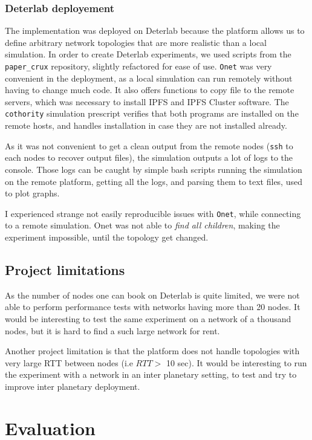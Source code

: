 \documentclass[a4paper,11pt,oneside]{report}
\begin{document}
\subsection{Deterlab deployement}

The implementation was deployed on Deterlab \cite{deterlab} because the platform allows us to define arbitrary network topologies that are more realistic than a local simulation. In order to create Deterlab experiments, we used scripts from the \texttt{paper\_crux} \cite{paper_crux} repository, slightly refactored for ease of use. \texttt{Onet} was very convenient in the deployment, as a local simulation can run remotely without having to change much code. It also offers functions to copy file to the remote servers, which was necessary to install IPFS and IPFS Cluster software. The \texttt{cothority} simulation prescript verifies that both programs are installed on the remote hosts, and handles installation in case they are not installed already.

As it was not convenient to get a clean output from the remote nodes (\texttt{ssh} to each nodes to recover output files), the simulation outputs a lot of logs to the console. Those logs can be caught by simple bash scripts running the simulation on the remote platform, getting all the logs, and parsing them to text files, used to plot graphs.

I experienced strange not easily reproducible issues with \texttt{Onet}, while connecting to a remote simulation. Onet was not able to \textit{find all children}, making the experiment impossible, until the topology get changed.

\section{Project limitations}

As the number of nodes one can book on Deterlab is quite limited, we were not able to perform performance tests with networks having more than 20 nodes. It would be interesting to test the same experiment on a network of a thousand nodes, but it is hard to find a such large network for rent.

Another project limitation is that the platform does not handle topologies with very large RTT between nodes (i.e $RTT >$ 10 sec). It would be interesting to run the experiment with a network in an inter planetary setting, to test and try to improve inter planetary deployment.

\chapter{Evaluation}
\end{document}

